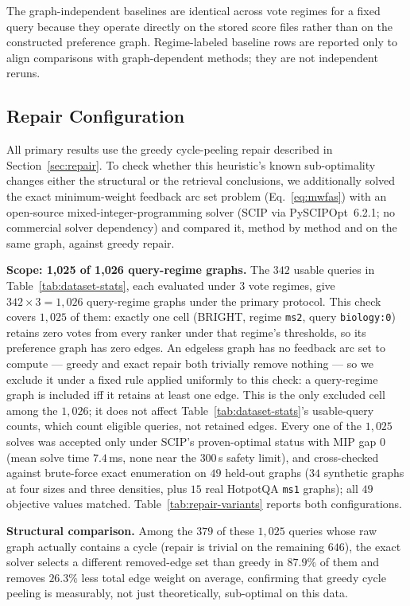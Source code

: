 \documentclass[manuscript,anonymous,review]{acmart}
\begin{document}
The graph-independent baselines are identical across vote regimes for a fixed
query because they operate directly on the stored score files rather than on
the constructed preference graph. Regime-labeled baseline rows are reported
only to align comparisons with graph-dependent methods; they are not
independent reruns.

\subsection{Repair Configuration}
\label{sec:repair-variants}

All primary results use the greedy cycle-peeling repair described in
Section~\ref{sec:repair}. To check whether this heuristic's known
sub-optimality changes either the structural or the retrieval conclusions, we
additionally solved the exact minimum-weight feedback arc set problem
(Eq.~\eqref{eq:mwfas}) with an open-source mixed-integer-programming solver
(SCIP via PySCIPOpt~6.2.1; no commercial solver dependency) and compared it,
method by method and on the same graph, against greedy repair.

\textbf{Scope: 1{,}025 of 1{,}026 query-regime graphs.} The $342$ usable
queries in Table~\ref{tab:dataset-stats}, each evaluated under $3$ vote
regimes, give $342\times3=1{,}026$ query-regime graphs under the primary
protocol. This check covers $1{,}025$ of them: exactly one cell (BRIGHT,
regime \texttt{ms2}, query \texttt{biology:0}) retains zero votes from every
ranker under that regime's thresholds, so its preference graph has zero
edges. An edgeless graph has no feedback arc set to compute --- greedy and
exact repair both trivially remove nothing --- so we exclude it under a
fixed rule applied uniformly to this check: a query-regime graph is included
iff it retains at least one edge. This is the only excluded cell among the
$1{,}026$; it does not affect Table~\ref{tab:dataset-stats}'s usable-query
counts, which count eligible queries, not retained edges. Every one of the
$1{,}025$ solves was accepted only under SCIP's proven-optimal status with
MIP gap $0$ (mean solve time $7.4$\,ms, none near the $300$\,s safety limit),
and cross-checked against brute-force exact enumeration on $49$ held-out
graphs ($34$ synthetic graphs at four sizes and three densities, plus $15$
real HotpotQA \texttt{ms1} graphs); all $49$ objective values matched.
Table~\ref{tab:repair-variants} reports both configurations.

\textbf{Structural comparison.} Among the $379$ of these $1{,}025$ queries
whose raw graph actually contains a cycle (repair is trivial on the
remaining $646$), the exact solver selects a different removed-edge set than
greedy in $87.9\%$ of them and removes $26.3\%$ less total edge weight on
average, confirming that greedy cycle peeling is measurably, not just
theoretically, sub-optimal on this data.
\end{document}
